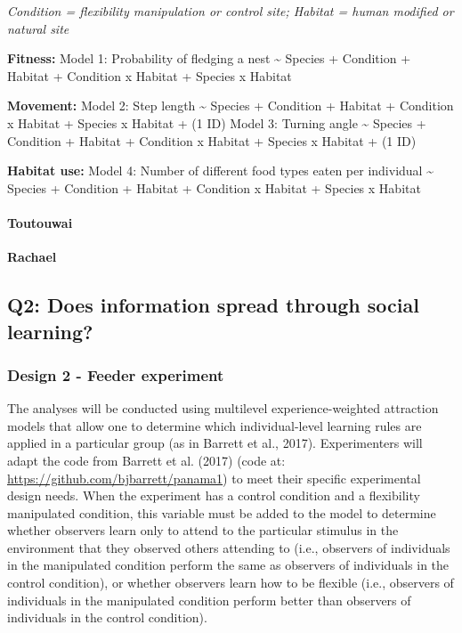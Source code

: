 \documentclass[
]{article}
\begin{document}
\emph{Condition = flexibility manipulation or control site; Habitat =
human modified or natural site}

\textbf{Fitness:} Model 1: Probability of fledging a nest
\textasciitilde{} Species + Condition + Habitat + Condition x Habitat +
Species x Habitat

\textbf{Movement:} Model 2: Step length \textasciitilde{} Species +
Condition + Habitat + Condition x Habitat + Species x Habitat + (1
\textbar{} ID) Model 3: Turning angle \textasciitilde{} Species +
Condition + Habitat + Condition x Habitat + Species x Habitat + (1
\textbar{} ID)

\textbf{Habitat use:} Model 4: Number of different food types eaten per
individual \textasciitilde{} Species + Condition + Habitat + Condition x
Habitat + Species x Habitat

\hypertarget{toutouwai-1}{%
\paragraph{Toutouwai}\label{toutouwai-1}}

\textbf{Rachael}

\hypertarget{q2-does-information-spread-through-social-learning-1}{%
\subsection{Q2: Does information spread through social
learning?}\label{q2-does-information-spread-through-social-learning-1}}

\hypertarget{design-2---feeder-experiment-2}{%
\subsubsection{Design 2 - Feeder
experiment}\label{design-2---feeder-experiment-2}}

The analyses will be conducted using multilevel experience-weighted
attraction models that allow one to determine which individual-level
learning rules are applied in a particular group (as in Barrett et al.,
2017). Experimenters will adapt the code from Barrett et al. (2017)
(code at: \url{https://github.com/bjbarrett/panama1}) to meet their
specific experimental design needs. When the experiment has a control
condition and a flexibility manipulated condition, this variable must be
added to the model to determine whether observers learn only to attend
to the particular stimulus in the environment that they observed others
attending to (i.e., observers of individuals in the manipulated
condition perform the same as observers of individuals in the control
condition), or whether observers learn how to be flexible (i.e.,
observers of individuals in the manipulated condition perform better
than observers of individuals in the control condition).
\end{document}
